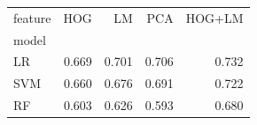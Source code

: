 \begin{tabular}{lrrrr}
\toprule
feature & HOG & LM & PCA & HOG+LM \\
model &  &  &  &  \\
\midrule
LR & 0.669 & 0.701 & 0.706 & 0.732 \\
SVM & 0.660 & 0.676 & 0.691 & 0.722 \\
RF & 0.603 & 0.626 & 0.593 & 0.680 \\
\bottomrule
\end{tabular}
